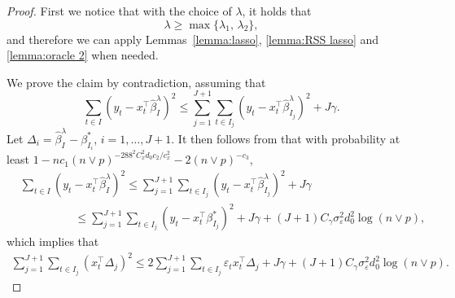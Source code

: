 \documentclass[twoside]{article}
\begin{document}
\begin{proof}
First we notice that with the choice of $\lambda$, it holds that 
	\[
		\lambda \geq \max\{\lambda_1, \, \lambda_2\},
	\]
	and therefore we can apply Lemmas~\ref{lemma:lasso}, \ref{lemma:RSS lasso} and \ref{lemma:oracle 2} when needed.

We prove the claim by contradiction, assuming that
	\[
		\sum_{t\in I } (y_t -x_t^{\top} \widehat \beta^\lambda_ I )^2 \leq \sum_{j=1}^{J+1} \sum_{t\in I_j  } (y_t -x_t^{\top} \widehat \beta^\lambda_ {I_j}  )^2 + J \gamma.
	\]
	Let $\Delta_i = \widehat \beta^\lambda_I  - \beta_{I_i}^*$, $i = 1, \ldots, J+1$.  It then follows from  that with probability at least $1 - nc_1 (n \vee p)^{-288^2C_x^2d_0c_2/c_x^2} - 2(n \vee p)^{-c_3}$,
	\begin{align}
		& \sum_{t \in I} (y_t - x_t^{\top} \widehat \beta^\lambda_I )^2 \leq \sum_{j=1}^{J+1} \sum_{t \in I_j} (y_t - x_t^{\top} \widehat \beta^\lambda_{I_j})^2 + J \gamma \nonumber \\
		& \hspace{2cm}\leq  \sum_{j=1}^{J+1} \sum_{t \in I_j} (y_t - x_t^{\top} \beta^*_{I_j})^2 + J \gamma + (J+1) C_{\gamma} \sigma_{\varepsilon}^2 d_0^2\log(n \vee p), \nonumber
	\end{align}
	which implies that 
	\begin{align} 
		\sum_{j=1}^{J+1} \sum_{t\in I_j} (x_t^{\top}\Delta_j)^2 \leq 2 \sum_{j=1}^{J+1}  \sum_{t\in I_j} \varepsilon_t x_t^{\top} \Delta_j + J \gamma + (J+1)C_{\gamma} \sigma_{\varepsilon}^2 d_0^2\log(n \vee p). \label{eq:three change point first step}
	\end{align}



\end{proof}
\end{document}
